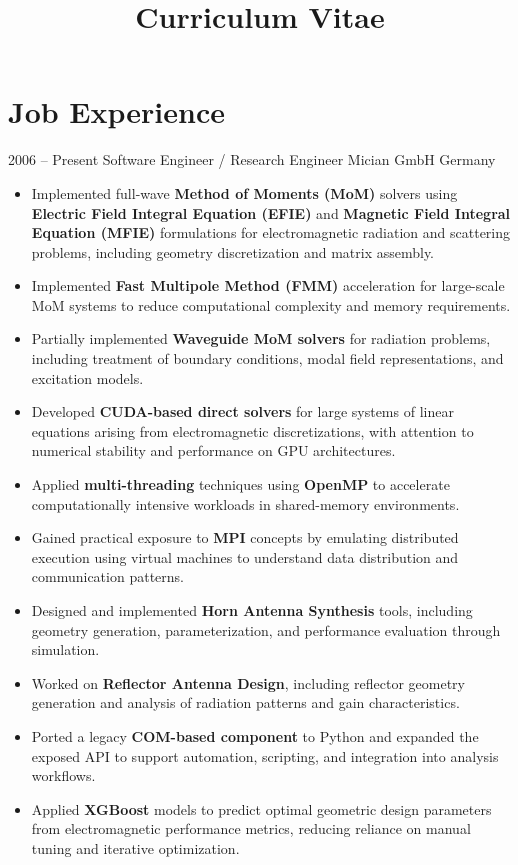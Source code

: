 \documentclass[11pt,a4paper,sans]{moderncv}
\title{Curriculum Vitae}
\begin{document}
	\makecvtitle
	
	\section{Job Experience}
	
	\cventry
	{2006 -- Present}
	{Software Engineer / Research Engineer}
	{Mician GmbH}
	{Germany}
	{}
	{				
		\begin{itemize}
			\item Implemented full-wave \textbf{Method of Moments (MoM)} solvers using \textbf{Electric Field Integral Equation (EFIE)} and \textbf{Magnetic Field Integral Equation (MFIE)} formulations for electromagnetic radiation and scattering problems, including geometry discretization and matrix assembly.
			\item Implemented \textbf{Fast Multipole Method (FMM)} acceleration for large-scale MoM systems to reduce computational complexity and memory requirements.
			\item Partially implemented \textbf{Waveguide MoM solvers} for radiation problems, including treatment of boundary conditions, modal field representations, and excitation models.
			\item Developed \textbf{CUDA-based direct solvers} for large systems of linear equations arising from electromagnetic discretizations, with attention to numerical stability and performance on GPU architectures.
			\item Applied \textbf{multi-threading} techniques using \textbf{OpenMP} to accelerate computationally intensive workloads in shared-memory environments.
			\item Gained practical exposure to \textbf{MPI} concepts by emulating distributed execution using virtual machines to understand data distribution and communication patterns.
			\item Designed and implemented \textbf{Horn Antenna Synthesis} tools, including geometry generation, parameterization, and performance evaluation through simulation.
			\item Worked on \textbf{Reflector Antenna Design}, including reflector geometry generation and analysis of radiation patterns and gain characteristics.
			\item Ported a legacy \textbf{COM-based component} to Python and expanded the exposed API to support automation, scripting, and integration into analysis workflows.
			\item Applied \textbf{XGBoost} models to predict optimal geometric design parameters from electromagnetic performance metrics, reducing reliance on manual tuning and iterative optimization.
		\end{itemize}		
	}
	
\end{document}
